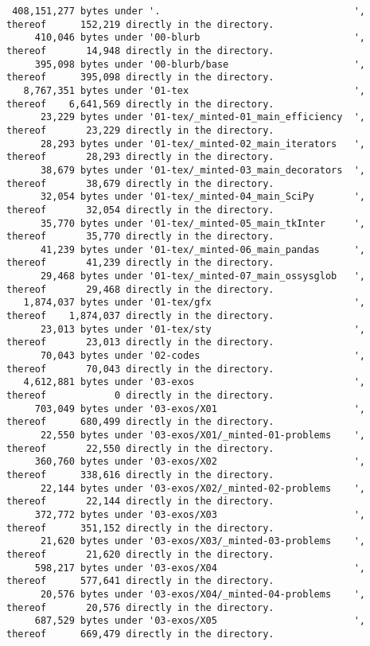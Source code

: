 \documentclass[
	english,
	fontsize=10pt,
	parskip=half,
	titlepage=true,
	DIV=12
]{scrartcl}
\begin{document}
\begin{verbatim}
 408,151,277 bytes under '.                                  ', thereof      152,219 directly in the directory.
     410,046 bytes under '00-blurb                           ', thereof       14,948 directly in the directory.
     395,098 bytes under '00-blurb/base                      ', thereof      395,098 directly in the directory.
   8,767,351 bytes under '01-tex                             ', thereof    6,641,569 directly in the directory.
      23,229 bytes under '01-tex/_minted-01_main_efficiency  ', thereof       23,229 directly in the directory.
      28,293 bytes under '01-tex/_minted-02_main_iterators   ', thereof       28,293 directly in the directory.
      38,679 bytes under '01-tex/_minted-03_main_decorators  ', thereof       38,679 directly in the directory.
      32,054 bytes under '01-tex/_minted-04_main_SciPy       ', thereof       32,054 directly in the directory.
      35,770 bytes under '01-tex/_minted-05_main_tkInter     ', thereof       35,770 directly in the directory.
      41,239 bytes under '01-tex/_minted-06_main_pandas      ', thereof       41,239 directly in the directory.
      29,468 bytes under '01-tex/_minted-07_main_ossysglob   ', thereof       29,468 directly in the directory.
   1,874,037 bytes under '01-tex/gfx                         ', thereof    1,874,037 directly in the directory.
      23,013 bytes under '01-tex/sty                         ', thereof       23,013 directly in the directory.
      70,043 bytes under '02-codes                           ', thereof       70,043 directly in the directory.
   4,612,881 bytes under '03-exos                            ', thereof            0 directly in the directory.
     703,049 bytes under '03-exos/X01                        ', thereof      680,499 directly in the directory.
      22,550 bytes under '03-exos/X01/_minted-01-problems    ', thereof       22,550 directly in the directory.
     360,760 bytes under '03-exos/X02                        ', thereof      338,616 directly in the directory.
      22,144 bytes under '03-exos/X02/_minted-02-problems    ', thereof       22,144 directly in the directory.
     372,772 bytes under '03-exos/X03                        ', thereof      351,152 directly in the directory.
      21,620 bytes under '03-exos/X03/_minted-03-problems    ', thereof       21,620 directly in the directory.
     598,217 bytes under '03-exos/X04                        ', thereof      577,641 directly in the directory.
      20,576 bytes under '03-exos/X04/_minted-04-problems    ', thereof       20,576 directly in the directory.
     687,529 bytes under '03-exos/X05                        ', thereof      669,479 directly in the directory.

\end{verbatim}
\end{document}
